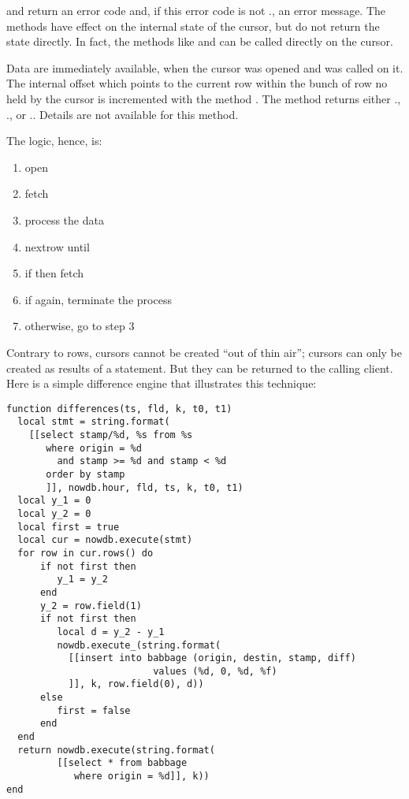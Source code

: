  and  return an error code
and, if this error code is not .,
an error message. The methods have effect on
the internal state of the cursor, but do not return
the state directly. In fact, the  methods
like  and  can be called
directly on the cursor.

Data are immediately available,
when the cursor was opened and 
was called on it.
The internal offset which points to the current row
within the bunch of row no held by the cursor is
incremented with the method .
The method returns either
.,
.,
or ..
Details are not available for this method.

\begin{minipage}{\textwidth}
The logic, hence, is:
\begin{enumerate}
\item open
\item fetch
\item process the data
\item nextrow until 
\item if  then fetch
\item if  again, terminate the process
\item otherwise, go to step 3 
\end{enumerate}
\end{minipage}

Contrary to rows, cursors cannot be created
``out of thin air''; cursors can only be created
as results of a  statement.
But they can be returned to the calling client.
Here is a simple difference engine that
illustrates this technique:

\begin{lua}
\begin{lstlisting}
function differences(ts, fld, k, t0, t1)
  local stmt = string.format(
    [[select stamp/%d, %s from %s
       where origin = %d
         and stamp >= %d and stamp < %d
       order by stamp
       ]], nowdb.hour, fld, ts, k, t0, t1)
  local y_1 = 0
  local y_2 = 0
  local first = true
  local cur = nowdb.execute(stmt)
  for row in cur.rows() do
      if not first then
         y_1 = y_2
      end
      y_2 = row.field(1)
      if not first then
         local d = y_2 - y_1
         nowdb.execute_(string.format(
           [[insert into babbage (origin, destin, stamp, diff)
                          values (%d, 0, %d, %f)
           ]], k, row.field(0), d))
      else
         first = false
      end
  end
  return nowdb.execute(string.format(
         [[select * from babbage
            where origin = %d]], k))
end
\end{lstlisting}
\end{lua}

